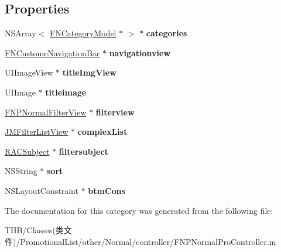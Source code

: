 \subsection*{Properties}
\begin{DoxyCompactItemize}
\item 
\mbox{\label{category_f_n_p_normal_pro_controller_07_08_a6895ac2b230e0ec5d7cb50522a05d9f5}} 
N\+S\+Array$<$ \mbox{\hyperlink{interface_f_n_category_model}{F\+N\+Category\+Model}} $\ast$ $>$ $\ast$ {\bfseries categories}
\item 
\mbox{\label{category_f_n_p_normal_pro_controller_07_08_a049c4eadc51e3b7579ce83c1d1fff682}} 
\mbox{\hyperlink{interface_f_n_custome_navigation_bar}{F\+N\+Custome\+Navigation\+Bar}} $\ast$ {\bfseries navigationview}
\item 
\mbox{\label{category_f_n_p_normal_pro_controller_07_08_adc3b5f7aee6e225475408bbf22e80896}} 
U\+I\+Image\+View $\ast$ {\bfseries title\+Img\+View}
\item 
\mbox{\label{category_f_n_p_normal_pro_controller_07_08_a1406973b4249b0f451ae04ee8e2519ab}} 
U\+I\+Image $\ast$ {\bfseries titleimage}
\item 
\mbox{\label{category_f_n_p_normal_pro_controller_07_08_a07992dc8897c5720f856afb91e7ec4bc}} 
\mbox{\hyperlink{interface_f_n_p_normal_filter_view}{F\+N\+P\+Normal\+Filter\+View}} $\ast$ {\bfseries filterview}
\item 
\mbox{\label{category_f_n_p_normal_pro_controller_07_08_ab690dec961f17cad3994666e191bb5f8}} 
\mbox{\hyperlink{interface_j_m_filter_list_view}{J\+M\+Filter\+List\+View}} $\ast$ {\bfseries complex\+List}
\item 
\mbox{\label{category_f_n_p_normal_pro_controller_07_08_a852b6a336e9f3a9c28df3f6d5eef4b50}} 
\mbox{\hyperlink{interface_r_a_c_subject}{R\+A\+C\+Subject}} $\ast$ {\bfseries filtersubject}
\item 
\mbox{\label{category_f_n_p_normal_pro_controller_07_08_aa5e22b83127b5d5ac740b79536525789}} 
N\+S\+String $\ast$ {\bfseries sort}
\item 
\mbox{\label{category_f_n_p_normal_pro_controller_07_08_a78d5d519d782603244700952547dee93}} 
N\+S\+Layout\+Constraint $\ast$ {\bfseries btm\+Cons}
\end{DoxyCompactItemize}


The documentation for this category was generated from the following file\+:\begin{DoxyCompactItemize}
\item 
T\+H\+B/\+Classes(类文件)/\+Promotional\+List/other/\+Normal/controller/F\+N\+P\+Normal\+Pro\+Controller.\+m\end{DoxyCompactItemize}
